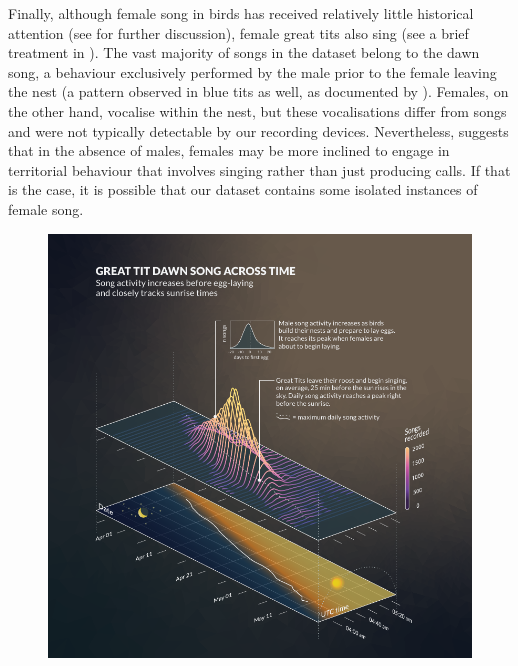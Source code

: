 Finally, although female song in birds has received relatively little historical attention (see \cite{langmore2020, odom2018, riebel2005} for further discussion), female great tits also sing (see a brief treatment in \cite{gompertz1961, hinde1952}). The vast majority of songs in the dataset belong to the dawn song, a behaviour exclusively performed by the male prior to the female leaving the nest (a pattern observed in blue tits as well, as documented by \cite{sierro2022}). Females, on the other hand, vocalise within the nest, but these vocalisations \parencite{gorissen2005, gorissen2004} differ from songs and were not typically detectable by our recording devices. Nevertheless, \cite{hinde1952} suggests that in the absence of males, females may be more inclined to engage in territorial behaviour that involves singing rather than just producing calls. If that is the case, it is possible that our dataset contains some isolated instances of female song.

\begin{figure}[th!]
    \centering
    \includegraphics[width=\linewidth]{figures/chapter_3/FIG4-AB.pdf}
    \label{c3_fig:timing}
\end{figure}

